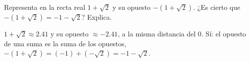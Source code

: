 \documentclass[11pt]{article}
\begin{document}
\begin{preguntas}
\pregunta[1] Representa en la recta real $1 + \sqrt{2}$ y su opuesto $-(1 + \sqrt{2})$.
¿Es cierto que $-(1 + \sqrt{2}) = -1 - \sqrt{2}$? Explica.
\begin{center}
\end{center}
\begin{solucion}
$1 + \sqrt{2} \approx \num{2,41}$ y su opuesto $\approx -\num{2,41}$, a la misma distancia
del $0$. Sí: el opuesto de una suma es la suma de los opuestos,
$-(1 + \sqrt{2}) = (-1) + (-\sqrt{2}) = -1 - \sqrt{2}$.
\end{solucion}

\end{preguntas}
\end{document}
